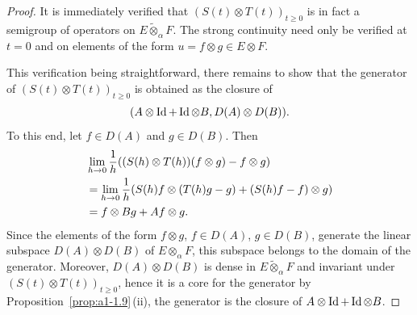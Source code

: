 \begin{proof}
It is immediately verified that $(S(t)\otimes T(t))_{t\geq 0}$ is in fact a semigroup of operators on 
$ E \widetilde{\otimes}_{\alpha} F $. 
The strong continuity need only be verified at $t = 0$ and on elements of the form $u = f \otimes g \in E \otimes F$.

This verification being straightforward, there remains to show that the generator of\/ $(S(t)\otimes T(t))_{t\geq 0}$ is obtained as the closure of 
%
\[
	(A \otimes \operatorname{Id} + \operatorname{Id} \otimes B,D(A) \otimes D(B)) .
\]
%
To this end, let $f \in D(A)$ and $g \in D(B)$. 
Then
\begin{align*}
    &\lim_{h\to 0} \frac{1}{h}\mleft(
        \mleft(S(h) \otimes T(h)\mright)(f \otimes g) - f \otimes g
      \mright) \\
    &= \lim_{h\to 0} \frac{1}{h}\mleft(
        S(h)f \otimes (T(h)g - g) + (S(h)f - f) \otimes g
      \mright) \\
    &= f \otimes Bg + Af \otimes g.
\end{align*}
Since the elements of the form $f \otimes g$, $f \in D(A)$, $g \in D(B)$, generate the linear subspace $D(A) \otimes D(B)$ of\/ $E \otimes_{\alpha} F$, this subspace belongs to the domain of the generator.
Moreover, $D(A) \otimes D(B)$ is dense in $E \widetilde{\otimes}_{\alpha} F$ and invariant under $(S(t)\otimes T(t))_{t\geq 0}$, hence it is a core for the generator by Proposition~\ref{prop:a1-1.9}\,(ii), \ie the generator is the closure of\/ $A \otimes \operatorname{Id} + \operatorname{Id} \otimes B$.
\end{proof}
